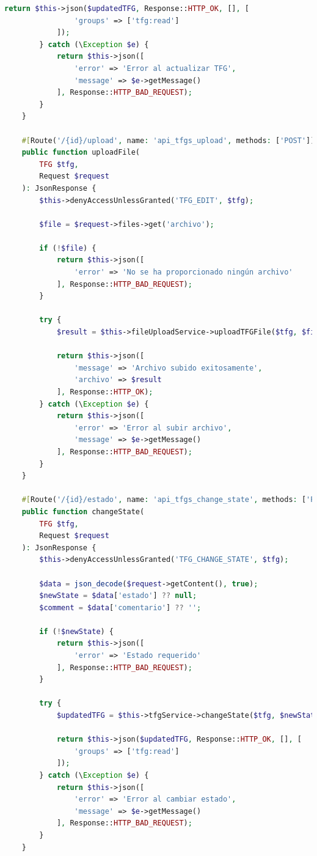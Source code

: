 \documentclass[12pt,a4paper,oneside]{report}
\begin{document}
\begin{lstlisting}[language=PHP]
            return $this->json($updatedTFG, Response::HTTP_OK, [], [
                'groups' => ['tfg:read']
            ]);
        } catch (\Exception $e) {
            return $this->json([
                'error' => 'Error al actualizar TFG',
                'message' => $e->getMessage()
            ], Response::HTTP_BAD_REQUEST);
        }
    }

    #[Route('/{id}/upload', name: 'api_tfgs_upload', methods: ['POST'])]
    public function uploadFile(
        TFG $tfg,
        Request $request
    ): JsonResponse {
        $this->denyAccessUnlessGranted('TFG_EDIT', $tfg);

        $file = $request->files->get('archivo');
        
        if (!$file) {
            return $this->json([
                'error' => 'No se ha proporcionado ningún archivo'
            ], Response::HTTP_BAD_REQUEST);
        }

        try {
            $result = $this->fileUploadService->uploadTFGFile($tfg, $file);

            return $this->json([
                'message' => 'Archivo subido exitosamente',
                'archivo' => $result
            ], Response::HTTP_OK);
        } catch (\Exception $e) {
            return $this->json([
                'error' => 'Error al subir archivo',
                'message' => $e->getMessage()
            ], Response::HTTP_BAD_REQUEST);
        }
    }

    #[Route('/{id}/estado', name: 'api_tfgs_change_state', methods: ['PUT'])]
    public function changeState(
        TFG $tfg,
        Request $request
    ): JsonResponse {
        $this->denyAccessUnlessGranted('TFG_CHANGE_STATE', $tfg);

        $data = json_decode($request->getContent(), true);
        $newState = $data['estado'] ?? null;
        $comment = $data['comentario'] ?? '';

        if (!$newState) {
            return $this->json([
                'error' => 'Estado requerido'
            ], Response::HTTP_BAD_REQUEST);
        }

        try {
            $updatedTFG = $this->tfgService->changeState($tfg, $newState, $comment);

            return $this->json($updatedTFG, Response::HTTP_OK, [], [
                'groups' => ['tfg:read']
            ]);
        } catch (\Exception $e) {
            return $this->json([
                'error' => 'Error al cambiar estado',
                'message' => $e->getMessage()
            ], Response::HTTP_BAD_REQUEST);
        }
    }


\end{lstlisting}
\end{document}
